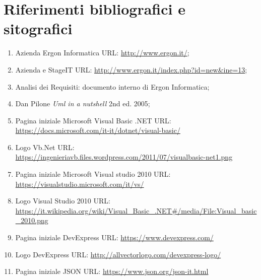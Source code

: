 

\chapter{Riferimenti bibliografici e sitografici}

\begin{enumerate}
    \item \label{sec:ergon} Azienda Ergon Informatica URL: \url{http://www.ergon.it/};
    
    \item \label{sec:ergon2} Azienda e StageIT URL: \url{http://www.ergon.it/index.php?id=new&ine=13};
    
    \item \label{analisi-requisiti} Analisi dei Requisiti: documento interno di Ergon Informatica;
    
    \item \label{uml} Dan Pilone \textit{Uml in a nutshell} 2nd ed. 2005;
    
    \item \label{vbnet} Pagina iniziale Microsoft Visual Basic .NET URL: \url{https://docs.microsoft.com/it-it/dotnet/visual-basic/}
    
    \item \label{vb-logo} Logo Vb.Net URL: \url{https://ingenieriavb.files.wordpress.com/2011/07/visualbasic-net1.png}
    
    \item \label{vs} Pagina iniziale Microsoft Visual studio 2010 URL: \url{https://visualstudio.microsoft.com/it/vs/}

    \item \label{vs-logo} Logo Visual Studio 2010 URL: \url{https://it.wikipedia.org/wiki/Visual_Basic_.NET#/media/File:Visual_basic_2010.png}
    
    \item \label{devexpress} Pagina iniziale DevExpress URL: \url{https://www.devexpress.com/}
    
    \item \label{devlogo} Logo DevExpress URL: \url{http://allvectorlogo.com/devexpress-logo/}
    
    \item \label{json} Pagina iniziale JSON URL: \url{https://www.json.org/json-it.html}
    

\end{enumerate}

